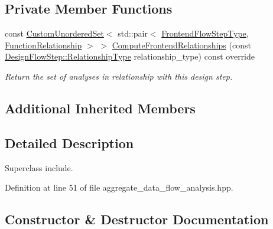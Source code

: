 \subsection*{Private Member Functions}
\begin{DoxyCompactItemize}
\item 
const \hyperlink{classCustomUnorderedSet}{Custom\+Unordered\+Set}$<$ std\+::pair$<$ \hyperlink{frontend__flow__step_8hpp_afeb3716c693d2b2e4ed3e6d04c3b63bb}{Frontend\+Flow\+Step\+Type}, \hyperlink{classFrontendFlowStep_af7cf30f2023e5b99e637dc2058289ab0}{Function\+Relationship} $>$ $>$ \hyperlink{classAggregateDataFlowAnalysis_a7d4599f7adabe9d4af16055fc5ad1cdb}{Compute\+Frontend\+Relationships} (const \hyperlink{classDesignFlowStep_a723a3baf19ff2ceb77bc13e099d0b1b7}{Design\+Flow\+Step\+::\+Relationship\+Type} relationship\+\_\+type) const override
\begin{DoxyCompactList}\small\item\em Return the set of analyses in relationship with this design step. \end{DoxyCompactList}\end{DoxyCompactItemize}
\subsection*{Additional Inherited Members}


\subsection{Detailed Description}
Superclass include. 

Definition at line 51 of file aggregate\+\_\+data\+\_\+flow\+\_\+analysis.\+hpp.



\subsection{Constructor \& Destructor Documentation}
\mbox{\label{classAggregateDataFlowAnalysis_a11a94cf943d80f0fefafbf8b91e72b20}} 
